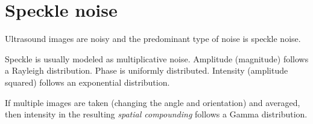 \section{Speckle noise}
Ultrasound images are noisy and the predominant type of noise is
speckle noise.

Speckle is usually modeled as multiplicative noise. Amplitude
(magnitude) follows a Rayleigh distribution. Phase is uniformly
distributed. Intensity (amplitude squared) follows an exponential
distribution.

If multiple images are taken (changing the angle and orientation) and
averaged, then intensity in the resulting \emph{spatial compounding}
\cite{bushberg2011essential} follows a Gamma distribution.
